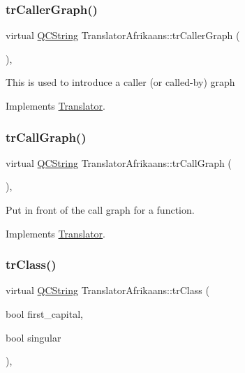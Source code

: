 \subsubsection{\texorpdfstring{trCallerGraph()}{trCallerGraph()}}
{\footnotesize\ttfamily virtual \mbox{\hyperlink{class_q_c_string}{Q\+C\+String}} Translator\+Afrikaans\+::tr\+Caller\+Graph (\begin{DoxyParamCaption}{ }\end{DoxyParamCaption})\hspace{0.3cm}{\ttfamily [inline]}, {\ttfamily [virtual]}}

This is used to introduce a caller (or called-\/by) graph 

Implements \mbox{\hyperlink{class_translator}{Translator}}.

\mbox{\label{class_translator_afrikaans_ad2bdc5e19c1685e5d868322cbd0b1cd9}} 
\subsubsection{\texorpdfstring{trCallGraph()}{trCallGraph()}}
{\footnotesize\ttfamily virtual \mbox{\hyperlink{class_q_c_string}{Q\+C\+String}} Translator\+Afrikaans\+::tr\+Call\+Graph (\begin{DoxyParamCaption}{ }\end{DoxyParamCaption})\hspace{0.3cm}{\ttfamily [inline]}, {\ttfamily [virtual]}}

Put in front of the call graph for a function. 

Implements \mbox{\hyperlink{class_translator}{Translator}}.

\mbox{\label{class_translator_afrikaans_afff8b0feee6ea78a45473c566328c3e4}} 
\subsubsection{\texorpdfstring{trClass()}{trClass()}}
{\footnotesize\ttfamily virtual \mbox{\hyperlink{class_q_c_string}{Q\+C\+String}} Translator\+Afrikaans\+::tr\+Class (\begin{DoxyParamCaption}\item[{bool}]{first\+\_\+capital,  }\item[{bool}]{singular }\end{DoxyParamCaption})\hspace{0.3cm}{\ttfamily [inline]}, {\ttfamily [virtual]}}

